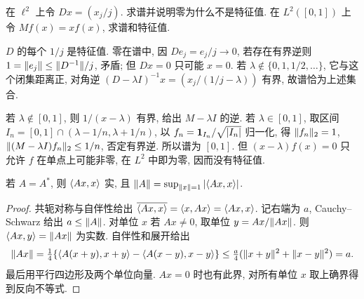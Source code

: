 \begin{example}\label{legacy:ch11:example1}
在 $\ell^2$ 上令 $Dx=(x_j/j)$. 求谱并说明零为什么不是特征值. 在 $L^2([0,1])$ 上令 $Mf(x)=xf(x)$, 求谱和特征值.
\end{example}
\begin{solution}
$D$ 的每个 $1/j$ 是特征值. 零在谱中, 因 $De_j=e_j/j\to0$, 若存在有界逆则 $1=\lVert e_j\rVert\le\lVert D^{-1}\rVert/j$, 矛盾; 但 $Dx=0$ 只可能 $x=0$. 若 $\lambda\notin\{0,1,1/2,\ldots\}$, 它与这个闭集距离正, 对角逆 $(D-\lambda I)^{-1}x=(x_j/(1/j-\lambda))$ 有界, 故谱恰为上述集合.

若 $\lambda\notin[0,1]$, 则 $1/(x-\lambda)$ 有界, 给出 $M-\lambda I$ 的逆. 若 $\lambda\in[0,1]$, 取区间 $I_n=[0,1]\cap(\lambda-1/n,\lambda+1/n)$, 以 $f_n=\mathbf 1_{I_n}/\sqrt{|I_n|}$ 归一化, 得 $\lVert f_n\rVert_2=1$, $\lVert (M-\lambda I)f_n\rVert_2\le1/n$, 否定有界逆. 所以谱为 $[0,1]$. 但 $(x-\lambda)f(x)=0$ 只允许 $f$ 在单点上可能非零, 在 $L^2$ 中即为零, 因而没有特征值.
\end{solution}

\begin{lemma}\label{lem:selfnorm}
若 $A=A^*$, 则 $\langle Ax,x\rangle$ 实, 且 $\lVert A\rVert=\sup_{\lVert x\rVert=1}|\langle Ax,x\rangle|$.
\end{lemma}
\begin{proof}
共轭对称与自伴性给出 $\overline{\langle Ax,x\rangle}=\langle x,Ax\rangle=\langle Ax,x\rangle$. 记右端为 $a$, Cauchy--Schwarz 给出 $a\le\lVert A\rVert$. 对单位 $x$ 若 $Ax\ne0$, 取单位 $y=Ax/\lVert Ax\rVert$. 则 $\langle Ax,y\rangle=\lVert Ax\rVert$ 为实数. 自伴性和展开给出
\[
\lVert Ax\rVert=\tfrac14\{\langle A(x+y),x+y\rangle-\langle A(x-y),x-y\rangle\}
\le\tfrac a4(\lVert x+y\rVert^2+\lVert x-y\rVert^2)=a.
\]
最后用平行四边形及两个单位向量. $Ax=0$ 时也有此界, 对所有单位 $x$ 取上确界得到反向不等式.
\end{proof}

